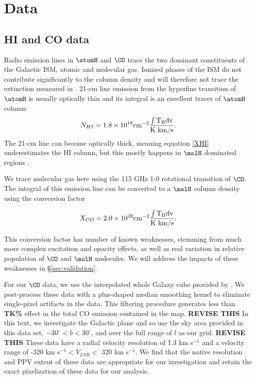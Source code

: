 \section{Data}
\label{sec:data}
\subsection{HI and CO data}

Radio emission lines in $\atomH$ and $\CO$ trace the two dominant constituents of the Galactic ISM, atomic and molecular gas. 
Ionized phases of the ISM do not contribute significantly to the column density and will therefore not trace the extinction measured in \citet{Green_2015}. 
21-cm line emission from the hyperfine transition of $\atomH$ is usually optically thin and its integral is an excellent tracer of $\atomH$ column:
\begin{equation}\label{XHI}
N_{HI} = 1.8 \times 10^{18} \rm cm^{-2} \frac{ \int T_B dv}{\rm K~km/s}.
\end{equation}
The 21-cm line can become optically thick, meaning equation \ref{XHI} underestimates the HI column, but this mostly happens in $\molH$ dominated regions \citep{Goldsmith_2007}. 

We trace molecular gas here using the 115 GHz 1-0 rotational transition of $\CO$. 
The integral of this emission line can be converted to a $\molH$ column density using the conversion factor \citep{Bolatto_2013}

\begin{equation}\label{XCO}
X_{CO} = 2.0 \times 10^{20} \rm cm^{-2} \frac{ \int T_B dv}{\rm K~km/s}.
\end{equation}

This conversion factor has number of known weaknesses, stemming from much more complex excitation and opacity effects, as well as real variation in relative population of $\CO$ and $\molH$ molecules. 
We will address the impacts of these weaknesses in \S \ref{sec:validation}. 

For our $\CO$ data, we use the interpolated whole Galaxy cube provided by \citet{Dame_2001}. 
We post-process these data with a plus-shaped median smoothing kernel to eliminate single-pixel artifacts in the data. 
This filtering procedure generates less than {\bf TK\%} effect in the total CO emission contained in the map. 
{\bf REVISE THIS} In this text, we investigate the Galactic plane and so use the sky area provided in this data set, $-30^\circ < b < 30^\circ$, and over the full range of $l$ as our grid. {\bf REVISE THIS}
These data have a radial velocity resolution of 1.3 km s$^{-1}$ and a velocity range of -320 km s$^{-1} < V_{LSR} <$ 320 km s$^{-1}$. 
We find that the native resolution and PPV extent of these data are appropriate for our investigation and retain the exact pixelization of these data for our analysis. 

